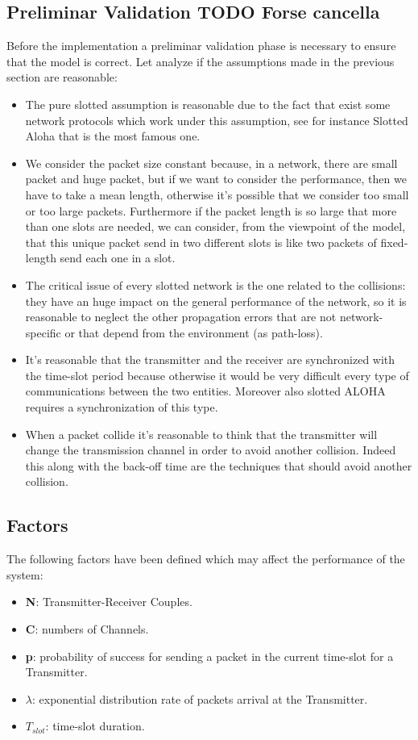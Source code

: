\subsection{Preliminar Validation TODO Forse cancella}
Before the implementation a preliminar validation phase is necessary to ensure that the model is correct. Let analyze if the assumptions made in the previous section are reasonable:
\begin{itemize}
	\item The pure slotted assumption is reasonable due to the fact that exist some network protocols which work under this assumption, see for instance Slotted Aloha that is the most famous one.
	\item We consider the packet size constant because, in a network, there are small packet and huge packet, but if we want to consider the performance, then we have to take a mean length, otherwise it's possible that we consider too small or too large packets. Furthermore if the packet length is so large that more than one slots are needed, we can consider, from the viewpoint of the model, that this unique packet send in two different slots is like two packets of fixed-length send each one in a slot.
	\item The critical issue of every slotted network is the one related to the collisions: they have an huge impact on the general performance of the network, so it is reasonable to neglect the other propagation errors that are not network-specific or that depend from the environment (as path-loss).
	\item It's reasonable that the transmitter and the receiver are synchronized with the time-slot period because otherwise it would be very difficult every type of communications between the two entities. Moreover also slotted ALOHA requires a synchronization of this type.
	\item When a packet collide it's reasonable to think that the transmitter will change the transmission channel in order to avoid another collision. Indeed this along with the back-off time are the techniques that should avoid another collision. 
\end{itemize}
\subsection{Factors}
The following factors have been defined which may affect the performance of the system:
\begin{itemize}
	\item \textbf{N}: Transmitter-Receiver Couples.
	\item \textbf{C}: numbers of Channels.
	\item \textbf{p}: probability of success for sending a packet in the current time-slot for a Transmitter.
	\item \textbf{$\lambda$}: exponential distribution rate of packets arrival at the Transmitter.
	\item $T_{slot}$: time-slot duration.
	
\end{itemize}